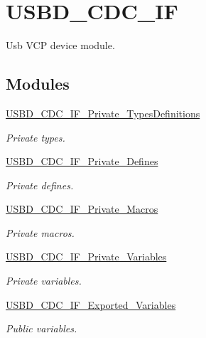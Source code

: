 \hypertarget{group__USBD__CDC__IF}{}\section{U\+S\+B\+D\+\_\+\+C\+D\+C\+\_\+\+IF}
\label{group__USBD__CDC__IF}


Usb V\+CP device module.  


\subsection*{Modules}
\begin{DoxyCompactItemize}
\item 
\hyperlink{group__USBD__CDC__IF__Private__TypesDefinitions}{U\+S\+B\+D\+\_\+\+C\+D\+C\+\_\+\+I\+F\+\_\+\+Private\+\_\+\+Types\+Definitions}
\begin{DoxyCompactList}\small\item\em Private types. \end{DoxyCompactList}\item 
\hyperlink{group__USBD__CDC__IF__Private__Defines}{U\+S\+B\+D\+\_\+\+C\+D\+C\+\_\+\+I\+F\+\_\+\+Private\+\_\+\+Defines}
\begin{DoxyCompactList}\small\item\em Private defines. \end{DoxyCompactList}\item 
\hyperlink{group__USBD__CDC__IF__Private__Macros}{U\+S\+B\+D\+\_\+\+C\+D\+C\+\_\+\+I\+F\+\_\+\+Private\+\_\+\+Macros}
\begin{DoxyCompactList}\small\item\em Private macros. \end{DoxyCompactList}\item 
\hyperlink{group__USBD__CDC__IF__Private__Variables}{U\+S\+B\+D\+\_\+\+C\+D\+C\+\_\+\+I\+F\+\_\+\+Private\+\_\+\+Variables}
\begin{DoxyCompactList}\small\item\em Private variables. \end{DoxyCompactList}\item 
\hyperlink{group__USBD__CDC__IF__Exported__Variables}{U\+S\+B\+D\+\_\+\+C\+D\+C\+\_\+\+I\+F\+\_\+\+Exported\+\_\+\+Variables}
\begin{DoxyCompactList}\small\item\em Public variables. \end{DoxyCompactList}\item 

\end{DoxyCompactItemize}
